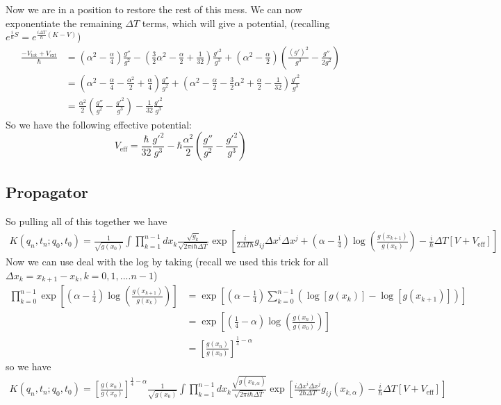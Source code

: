 Now we are in a position to restore the rest of this mess.  
We can now exponentiate the remaining $\Delta T$ terms, which will give a potential, (recalling $e^{\frac{i}{\hbar}S}=e^{\frac{i\Delta T}{\hbar}(K-V)}$)
\begin{align}
  \frac{-V_{\text{tot}}+V_{\text{ext}}}{\hbar} &= \left(\alpha^2 - \frac{\alpha}{4}\right)\frac{g''}{g^2} -\left(\frac{3}{2}\alpha ^2-\frac{\alpha}{2}  + \frac{1}{32}\right)\frac{g'^2}{g^3}+\left(\alpha^2 -\frac{\alpha}{2}\right)\left( \frac{(g')^2}{ g^{3}}-\frac{g''}{2g^2}\right)\\
&= \left(\alpha^2 - \frac{\alpha}{4} - \frac{\alpha^2}{2} +\frac{\alpha}{4}\right)\frac{g''}{g^2} +\left(\alpha^2 -\frac{\alpha}{2}-\frac{3}{2}\alpha ^2+\frac{\alpha}{2}- \frac{1}{32}\right)\frac{g'^2}{g^3}\\
&=  \frac{\alpha^2}{2}\left(\frac{g''}{g^2}-\frac{g'^2}{g^3}\right) - \frac{1}{32}\frac{g'^2}{g^3}
\end{align}
So we have the following effective potential:
\begin{equation}
\boxed{V_{\text{eff}} = \frac{\hbar}{32}\frac{g'^2}{g^3} -\hbar\frac{\alpha^2}{2}\left(\frac{g''}{g^2}-\frac{g'^2}{g^3}\right) }
\end{equation}

\subsection{Propagator}

So pulling all of this together we have 
\begin{align}
K(q_n,t_n; q_0,t_0) = \frac{1}{\sqrt{g(x_0)}}\int \prod_{k=1}^{n-1} dx_k\frac{\sqrt{g_k}}{\sqrt{2\pi i \hbar \Delta T}} \exp\left[ \frac{i}{2\Delta T\hbar}g_{ij}\Delta x^i\Delta x^j +\left(\alpha - \frac{1}{4}\right)\log\left(\frac{g(x_{k+1})}{g(x_k)}\right)-\frac{i}{\hbar}\Delta T [V+V_{\text{eff}}]\right]
\end{align}
Now we can use deal with the log by taking (recall we used this trick for all $\Delta x_k = x_{k+1}-x_k, k=0,1,....n-1$)
\begin{align}
\prod_{k=0}^{n-1}\exp\left[\left(\alpha - \frac{1}{4}\right)\log\left(\frac{g(x_{k+1})}{g(x_k)}\right)\right] & = \exp\left[\left(\alpha - \frac{1}{4}\right)\sum_{k=0}^{n-1}\left(\log[g(x_k)]-\log[g(x_{k+1})]\right)\right]\\
& = \exp\left[\left(\frac{1}{4}-\alpha\right)\log\left(\frac{g(x_{n})}{g(x_0)}\right)\right]\\
& = \left[\frac{g(x_{n})}{g(x_0)}\right]^{ \frac{1}{4}-\alpha}
\end{align}
so we have
\begin{align}
K(q_n,t_n; q_0,t_0) = \left[\frac{g(x_n)}{g(x_0)}\right]^{\frac{1}{4}-\alpha}\frac{1}{\sqrt{g(x_0)}}\int \prod_{k=1}^{n-1} dx_k\frac{\sqrt{g(x_{k,\alpha})}}{\sqrt{2\pi i \hbar \Delta T}} \exp\left[ \frac{i\Delta x^i\Delta x^j}{2\hbar\Delta T}g_{ij}(x_{k,\alpha}) -\frac{i}{\hbar}\Delta T [V+V_{\text{eff}}]\right]
\end{align}

